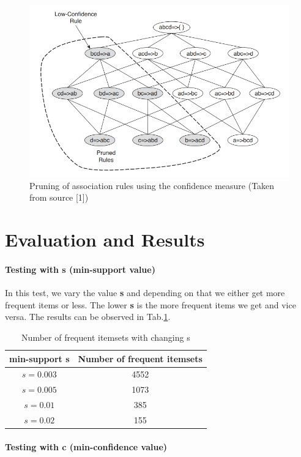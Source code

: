 \documentclass[a4paper, 11pt]{article}
\begin{document}
\begin{figure}[H]
  \includegraphics[width=\linewidth]{res/rules.PNG}
  \caption{Pruning of association rules using the confidence measure (Taken from source [1])}
  \label{fig:rules}
\end{figure}



\section{Evaluation and Results}

\paragraph{Testing with s (min-support value)}
In this test, we vary the value \textbf{s} and depending on that we either get more frequent items or less. The lower \textbf{s} is the more frequent items we get and vice versa. The results can be observed in Tab.\ref{tab:results_s}.
\begin{table}[H]
	\centering
	\begin{tabular}{|c|c|}
		\hline
		min-support  s & Number of frequent itemsets \\\hline
		$s=0.003$ & 4552\\
		$s=0.005$ & 1073 \\
		$s=0.01$ & 385  \\
		$s=0.02$ & 155 \\
		\hline
	\end{tabular}
	\caption{Number of frequent itemsets with changing s}
	\label{tab:results_s}
\end{table}
\paragraph{Testing with c (min-confidence value)}
\end{document}
